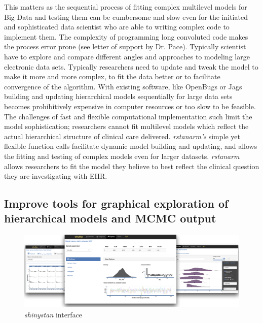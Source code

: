 \documentclass[11pt,notitlepage]{article}
\begin{document}
This matters as the sequential process of fitting complex multilevel models for Big Data  and testing them can be cumbersome and slow even for the initiated and sophisticated data scientist who are able to writing complex code to implement them. The complexity of programming long convoluted code makes the process error prone (see letter of support by Dr. Pace). Typically scientist have to explore and compare different angles and approaches to modeling large electronic data sets. Typically researchers need to update and tweak the model to make it more and more complex, to fit the data better or to facilitate convergence of the algorithm. With existing software, like OpenBugs or Jags building and updating hierarchical models sequentially for large data sets becomes prohibitively expensive in computer resources or too slow to be feasible. The challenges of fast and flexible computational implementation such limit the model sophistication;  researchers cannot fit multilevel models which reflect the actual hierarchical structure of clinical care delivered. \textit{rstanarm's} simple yet flexible function calls facilitate dynamic model building and updating, and allows the fitting and testing of complex models even for larger datasets. \textit{rstanarm} allows researchers to fit the model they believe to best reflect the clinical question they are investigating with EHR.

\subsection*{Improve tools for graphical exploration of hierarchical models and MCMC output}

\begin{figure}
  \vspace{-10pt}
 \includegraphics[scale=0.85]{Figures/shinystan.png}
  \vspace{-10pt}
  \caption{\textit{shinystan} interface}
    \label{fig:shinystan}
 \vspace{- 10pt}
\end{figure}
\end{document}
